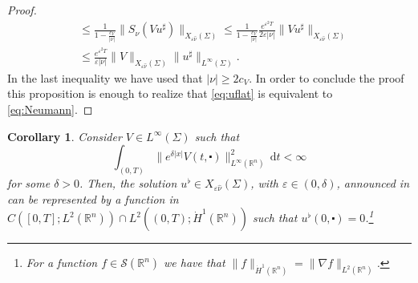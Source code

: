 \documentclass[10pt,a4paper]{amsart}
\newtheorem{proposition}{Proposition}[section]
\newtheorem{corollary}[proposition]{Corollary}
\newcommand{\R}{\mathbb{R}}
\newcommand{\dd}{\mathrm{d}}
\newcommand{\tm}{\mathrm{t}}
\newcommand{\marnote}[1]{\marginpar{\footnotesize #1}} %
\begin{document}
\begin{proof}
\begin{align*}
 &\leq \frac{1}{1-\frac{c_V}{  |\nu|}} \| S_\nu (V u^\sharp)\|_{X_{\varepsilon \hat{\nu}}(\Sigma)} \leq \frac{1}{1-\frac{c_V}{  |\nu|}} \frac{e^{\varepsilon^2 T}}{  2 \varepsilon |\nu|} \| V u^\sharp\|_{X_{\varepsilon \hat{\nu}}(\Sigma)}\\
   &\leq \frac{e^{\varepsilon^2 T}}{\varepsilon |\nu|} \| V \|_{X_{\varepsilon \hat{\nu}}(\Sigma)} \| u^\sharp\|_{L^\infty(\Sigma)}.
    \end{align*}
    In the last inequality we have used that $|\nu| \geq 2 c_V$.
    In order to conclude the proof this proposition is enough to realize that \eqref{eq:uflat} is equivalent to \eqref{eq:Neumann}.
\end{proof}
%
%
%

%
%
%
\begin{corollary}\label{cor:regularity_uflat}\sl 
Consider $V \in L^\infty (\Sigma) $ such that
\begin{equation*}
\int_{(0,T)} \| e^{\delta |x|} V(t, \centerdot) \|_{L^\infty (\R^n)}^2 \, \dd t < \infty
\end{equation*}
for some $\delta > 0$. Then, the solution $u^\flat \in X_{\varepsilon \hat \nu} (\Sigma)$, with
$\varepsilon \in (0, \delta)$, announced in 
can be represented by a function in $C([0, T]; L^2(\R^n))\cap L^2((0,T); \dot H^1(\R^n))$ such that 
$u^\flat(0,\centerdot) = 0$.\footnote{For a function $f \in \mathcal{S}(\R^n)$ we have that
$\| f \|_{\dot H^1 (\R^n)} = \| \nabla f  \|_{L^2(\R^n)}$.}
\end{corollary}
\end{document}
